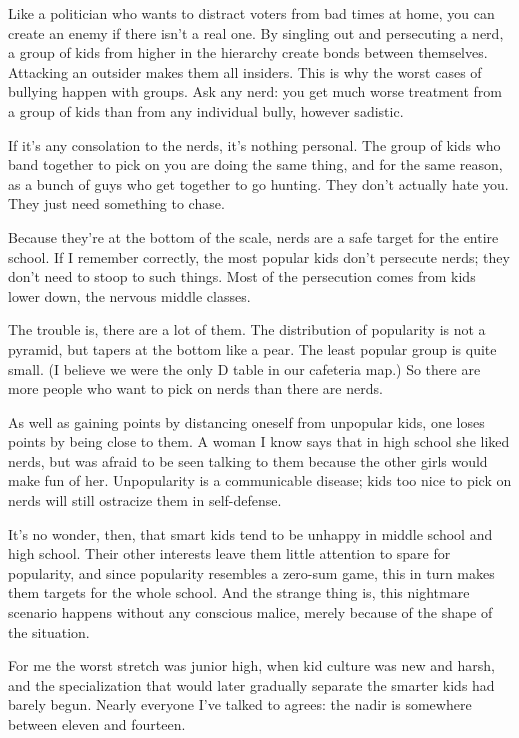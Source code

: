 Like a politician who wants to distract voters from bad times at home,
you can create an enemy if there isn't a real one. By singling out and
persecuting a nerd, a group of kids from higher in the hierarchy create
bonds between themselves. Attacking an outsider makes them all insiders.
This is why the worst cases of bullying happen with groups. Ask any
nerd: you get much worse treatment from a group of kids than from any
individual bully, however sadistic.

If it's any consolation to the nerds, it's nothing personal. The group
of kids who band together to pick on you are doing the same thing, and
for the same reason, as a bunch of guys who get together to go hunting.
They don't actually hate you. They just need something to chase.

Because they're at the bottom of the scale, nerds are a safe target for
the entire school. If I remember correctly, the most popular kids don't
persecute nerds; they don't need to stoop to such things. Most of the
persecution comes from kids lower down, the nervous middle classes.

The trouble is, there are a lot of them. The distribution of popularity
is not a pyramid, but tapers at the bottom like a pear. The least
popular group is quite small. (I believe we were the only D table in our
cafeteria map.) So there are more people who want to pick on nerds than
there are nerds.

As well as gaining points by distancing oneself from unpopular kids, one
loses points by being close to them. A woman I know says that in high
school she liked nerds, but was afraid to be seen talking to them
because the other girls would make fun of her. Unpopularity is a
communicable disease; kids too nice to pick on nerds will still
ostracize them in self-defense.

It's no wonder, then, that smart kids tend to be unhappy in middle
school and high school. Their other interests leave them little
attention to spare for popularity, and since popularity resembles a
zero-sum game, this in turn makes them targets for the whole school. And
the strange thing is, this nightmare scenario happens without any
conscious malice, merely because of the shape of the situation.

For me the worst stretch was junior high, when kid culture was new and
harsh, and the specialization that would later gradually separate the
smarter kids had barely begun. Nearly everyone I've talked to agrees:
the nadir is somewhere between eleven and fourteen.

